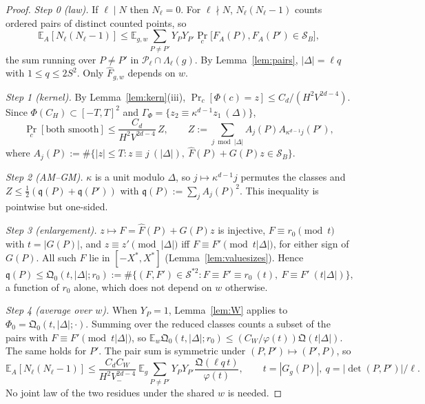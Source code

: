 \documentclass[11pt]{amsart}
\theoremstyle{definition}
\newcommand{\cP}{\mathcal{P}}
\newcommand{\cS}{\mathcal{S}}
\newcommand{\fq}{\mathfrak{q}}
\newcommand{\fQ}{\mathfrak{Q}}
\newcommand{\Vm}{V_{-}}
\newcommand{\XF}{X^{*}}
\newcommand{\Ex}{\mathbb{E}}
\newcommand{\Prob}{\Pr}
\begin{document}
\begin{proof}
\emph{Step 0 (law).} If $\ell\mid N$ then $N_\ell=0$. For $\ell\nmid N$, $N_\ell(N_\ell-1)$ counts ordered pairs of distinct
counted points, so
\[
\Ex_A[N_\ell(N_\ell-1)]\le\Ex_{g,w}\sum_{P\ne P'}Y_PY_{P'}\Prob_c\bigl[F_A(P),F_A(P')\in\cS_B\bigr],
\]
the sum running over $P\ne P'$ in $\cP_\ell\cap\Lambda_\ell(g)$. By Lemma~\ref{lem:pairs}, $|\Delta|=\ell q$ with $1\le q\le2S^2$. Only
$\hat F_{g,w}$ depends on $w$.

\emph{Step 1 (kernel).} By Lemma~\ref{lem:kern}(iii), $\Prob_c[\Phi(c)=z]\le C_d/(H^2V^{2d-4})$. Since $\Phi(C_H)\subset[-T,T]^2$ and
$\Gamma_\Phi=\{z_2\equiv\kappa^{d-1}z_1\ (\Delta)\}$,
\[
\Prob_c[\text{both smooth}]\le\frac{C_d}{H^2V^{2d-4}}\,Z,\qquad Z:=\sum_{j\bmod|\Delta|}A_j(P)A_{\kappa^{d-1}j}(P'),
\]
where $A_j(P):=\#\{|z|\le T:z\equiv j\ (|\Delta|),\ \hat F(P)+G(P)z\in\cS_B\}$.

\emph{Step 2 (AM--GM).} $\kappa$ is a unit modulo $\Delta$, so $j\mapsto\kappa^{d-1}j$ permutes the classes and
$Z\le\frac12(\fq(P)+\fq(P'))$ with $\fq(P):=\sum_jA_j(P)^2$. This inequality is pointwise but one-sided.

\emph{Step 3 (enlargement).} $z\mapsto F=\hat F(P)+G(P)z$ is injective, $F\equiv r_0\pmod t$ with $t=|G(P)|$, and $z\equiv z'\pmod{|\Delta|}$
iff $F\equiv F'\pmod{t|\Delta|}$, for either sign of $G(P)$. All such $F$ lie in $[-\XF,\XF]$ (Lemma~\ref{lem:valuesizes}). Hence
\[
\fq(P)\le\fQ_0(t,|\Delta|;r_0):=\#\{(F,F')\in\cS^{*2}:F\equiv F'\equiv r_0\ (t),\ F\equiv F'\ (t|\Delta|)\},
\]
a function of $r_0$ alone, which does not depend on $w$ otherwise.

\emph{Step 4 (average over $w$).} When $Y_P=1$, Lemma~\ref{lem:W} applies to $\Phi_0=\fQ_0(t,|\Delta|;\cdot)$. Summing over the reduced classes
counts a subset of the pairs with $F\equiv F'\pmod{t|\Delta|}$, so $\Ex_w\fQ_0(t,|\Delta|;r_0)\le(C_W/\varphi(t))\fQ(t|\Delta|)$. The same holds
for $P'$. The pair sum is symmetric under $(P,P')\mapsto(P',P)$, so
\begin{equation}\label{eq:afterw}
\Ex_A[N_\ell(N_\ell-1)]\le\frac{C_dC_W}{H^2\Vm^{2d-4}}\ \Ex_g\sum_{P\ne P'}Y_PY_{P'}\frac{\fQ(\ell q\,t)}{\varphi(t)},\qquad t=|G_g(P)|,\ q=|\det(P,P')|/\ell.
\end{equation}
No joint law of the two residues under the shared $w$ is needed.


\end{proof}
\end{document}
